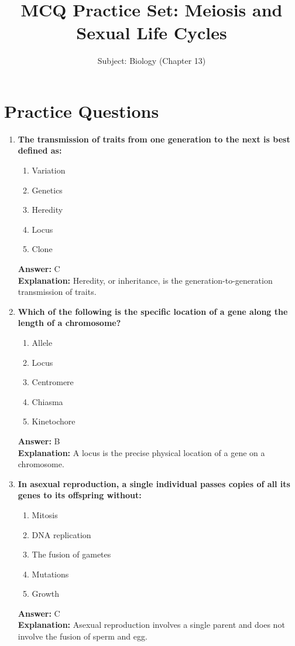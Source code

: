 \documentclass[11pt, a4paper]{article}
\title{MCQ Practice Set: Meiosis and Sexual Life Cycles}
\author{Subject: Biology (Chapter 13)}
\date{}
\begin{document}
\maketitle

\section*{Practice Questions}

\begin{enumerate}[leftmargin=*, label=\arabic*.]

\item \textbf{The transmission of traits from one generation to the next is best defined as:}
\begin{enumerate}[label=\Alph*.]
\item Variation
\item Genetics
\item Heredity
\item Locus
\item Clone
\end{enumerate}
\textbf{Answer:} C \\
\textbf{Explanation:} Heredity, or inheritance, is the generation-to-generation transmission of traits.

\item \textbf{Which of the following is the specific location of a gene along the length of a chromosome?}
\begin{enumerate}[label=\Alph*.]
\item Allele
\item Locus
\item Centromere
\item Chiasma
\item Kinetochore
\end{enumerate}
\textbf{Answer:} B \\
\textbf{Explanation:} A locus is the precise physical location of a gene on a chromosome.

\item \textbf{In asexual reproduction, a single individual passes copies of all its genes to its offspring without:}
\begin{enumerate}[label=\Alph*.]
\item Mitosis
\item DNA replication
\item The fusion of gametes
\item Mutations
\item Growth
\end{enumerate}
\textbf{Answer:} C \\
\textbf{Explanation:} Asexual reproduction involves a single parent and does not involve the fusion of sperm and egg.


\end{enumerate}
\end{document}
